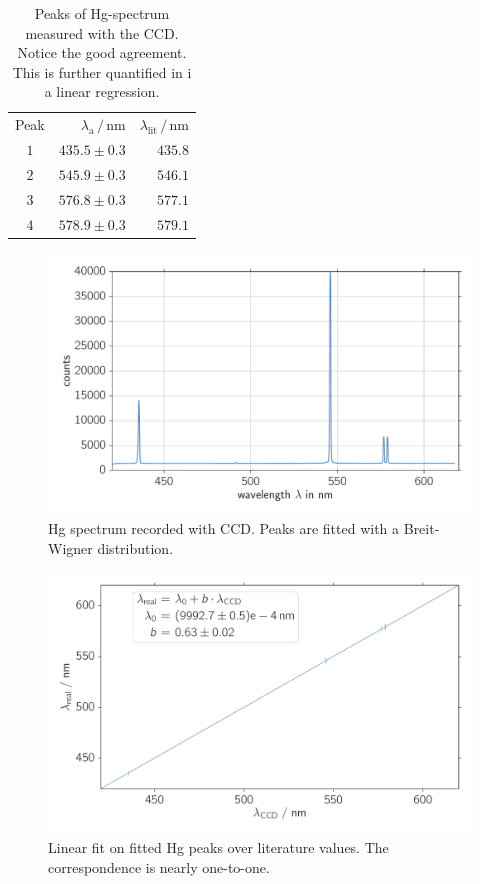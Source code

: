\begin{table}[htpb]
    \centering
    \caption{
        Peaks of Hg-spectrum measured with the CCD. Notice the good agreement. This is further quantified in i
        a linear regression. 
        }
    \label{tab:mono_calibration}
    \begin{tabular}{c r r}
        \rowcolor{LightCyan} Peak & $\lambda_\text{a} \,/\, \text{nm}$ & $\lambda_\text{lit} \,/\, \text{nm}$ \\
        \cellcolor{LightCyan}$1$ & $435.5 \pm 0.3$ & $435.8$   \\
        \cellcolor{LightCyan}$2$ & $545.9 \pm 0.3$ & $546.1$   \\
        \cellcolor{LightCyan}$3$ & $576.8 \pm 0.3$ & $577.1$   \\
        \cellcolor{LightCyan}$4$ & $578.9 \pm 0.3$ & $579.1$   
    \end{tabular}
\end{table}

\begin{figure}[htpb]
    \centering
    \includegraphics[width=0.8\linewidth]{analysis/figures/ccd_calibration_hg}
    \caption{Hg spectrum recorded with CCD. Peaks are fitted with a Breit-Wigner distribution.}
    \label{fig:ccd_calibration_hg}
\end{figure}

\begin{figure}[htpb]
    \centering
    \includegraphics[width=0.8\linewidth]{analysis/figures/ccd_calibration_fit}
    \caption{Linear fit on fitted Hg peaks over literature values. The correspondence is nearly one-to-one. }
    \label{fig:ccd_calibration_fit}
\end{figure}


